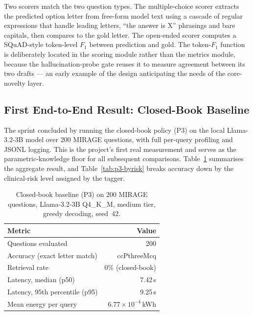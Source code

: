 Two scorers match the two question types. The multiple-choice scorer extracts
the predicted option letter from free-form model text using a cascade of
regular expressions that handle leading letters, ``the answer is X'' phrasings
and bare capitals, then compares to the gold letter. The open-ended scorer
computes a SQuAD-style token-level $F_1$ between prediction and gold. The
token-$F_1$ function is deliberately located in the scoring module rather than
the metrics module, because the hallucination-probe gate reuses it to measure
agreement between its two drafts --- an early example of the design
anticipating the needs of the core-novelty layer.

\subsection{First End-to-End Result: Closed-Book Baseline}
\label{sec:impl-result}

The sprint concluded by running the closed-book policy (P3) on the local
Llama-3.2-3B model over 200 MIRAGE questions, with full per-query profiling
and JSONL logging. This is the project's first real measurement and serves as
the parametric-knowledge floor for all subsequent comparisons.
Table~\ref{tab:p3-baseline} summarises the aggregate result, and
Table~\ref{tab:p3-byrisk} breaks accuracy down by the clinical-risk level
assigned by the tagger.

\begin{table}[ht]
  \centering
  \caption{Closed-book baseline (P3) on 200 MIRAGE questions, Llama-3.2-3B
           Q4\_K\_M, medium tier, greedy decoding, seed~42.}
  \label{tab:p3-baseline}
  \begin{tabular}{lr}
    \toprule
    \textbf{Metric} & \textbf{Value} \\
    \midrule
    Questions evaluated            & 200 \\
    Accuracy (exact letter match)  & ccPthreeMcq \\
    Retrieval rate                 & 0\% (closed-book) \\
    Latency, median (p50)          & 7.42\,s \\
    Latency, 95th percentile (p95) & 9.25\,s \\
    Mean energy per query          & $6.77\times10^{-4}$\,kWh \\
    \bottomrule
  \end{tabular}
\end{table}

